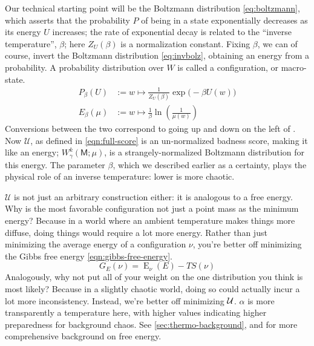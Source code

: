 \documentclass{article}
\theoremstyle{plain}
\theoremstyle{definition}
\theoremstyle{remark}
\DeclareMathOperator{\E}{\mathrm{E}} %
\newcommand{\sfM}{\mathsf M}
\numberwithin{equation}{section}
\begin{document}
	Our technical starting point will be the Boltzmann distribution \eqref{eq:boltzmann}, which asserts that the probability $P$ of being in a state exponentially decreases as its energy $U$ increases; the rate of exponential decay is related to the ``inverse temperature'', $\beta$; here $Z_U(\beta)$ is a normalization constant. Fixing $\beta$, we can of course, invert the Boltzmann distribution \eqref{eq:invbolz}, obtaining an energy from a probability. A probability distribution over $W$ is called a configuration, or macro-state.
 	\begin{align}
	 P_{\beta}(U) &:= w \mapsto  \frac{1}{Z_U(\beta)}\exp\Big(-\beta U(w)\Big) \label{eq:boltzmann} \\
 		E_{\beta}(\mu) &:= w \mapsto \frac{1}{\beta} \ln \left(\frac{1}{\mu(w)}\right) \label{eq:invbolz}
 	\end{align}
 	Conversions between the two correspond to going up and down on the left of . 
 	Now $\mathcal U$, as defined in \eqref{eqn:full-score} is an un-normalized badness score, making it like an energy; $W^k_\gamma(\sfM; \mu)$, is a strangely-normalized Boltzmann distribution for this energy. The parameter $\beta$, which we described earlier as a certainty, plays the physical role of an inverse temperature: lower is more chaotic. 
 	
 	$\mathcal U$ is not just an arbitrary construction either: it is analogous to a free energy. Why is the most favorable configuration not just a point mass as the minimum energy? Because in a world where an ambient temperature makes things more diffuse, doing things would require a lot more energy. Rather than just minimizing the average energy of a configuration $\nu$, you're better off minimizing the Gibbs free energy \eqref{eqn:gibbs-free-energy}. 
 	\begin{equation}
 		G_E(\nu) = {\E}_\nu( E )  - T S(\nu) \label{eqn:gibbs-free-energy}
 	\end{equation}
 	Analogously, why not put all of your weight on the one distribution you think is most likely? Because in a slightly chaotic world, doing so could actually incur a lot more inconsistency. Instead, we're better off minimizing $\cal U$. $\alpha$ is more transparently a temperature here, with higher values indicating higher preparedness for background chaos. 
	See \ref{sec:thermo-background}, and \cite{bethe,friston2009free} for more comprehensive background on free energy. %
	
\end{document}
